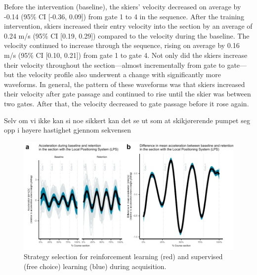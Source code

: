 \documentclass{article}
\begin{document}
Before the intervention (baseline), the skiers' velocity decreased on average by -0.14 (95\% CI [-0.36, 0.09]) from gate 1 to 4 in the sequence. After the training intervention, skiers increased their entry velocity into the section by an average of 0.24 m/s (95\% CI [0.19, 0.29]) compared to the velocity during the baseline. The velocity continued to increase through the sequence, rising on average by 0.16 m/s (95\% CI [0.10, 0.21]) from gate 1 to gate 4. Not only did the skiers increase their velocity throughout the section—almost incrementally from gate to gate—but the velocity profile also underwent a change with significantly more waveforms. In general, the pattern of these waveforms was that skiers increased their velocity after gate passage and continued to rise until the skier was between two gates. After that, the velocity decreased to gate passage before it rose again. 

Selv om vi ikke kan si noe sikkert kan det se ut som at skikjørerende pumpet seg opp i høyere hastighet gjennom sekvensen









\begin{figure}[H]
\centering
\includegraphics{figurer/figure_acc.pdf}
\caption{Strategy selection for reinforcement learning (red) and supervised (free choice) learning (blue) during acquisition.}\label{fig: choice_estimated}
\end{figure}
\end{document}

